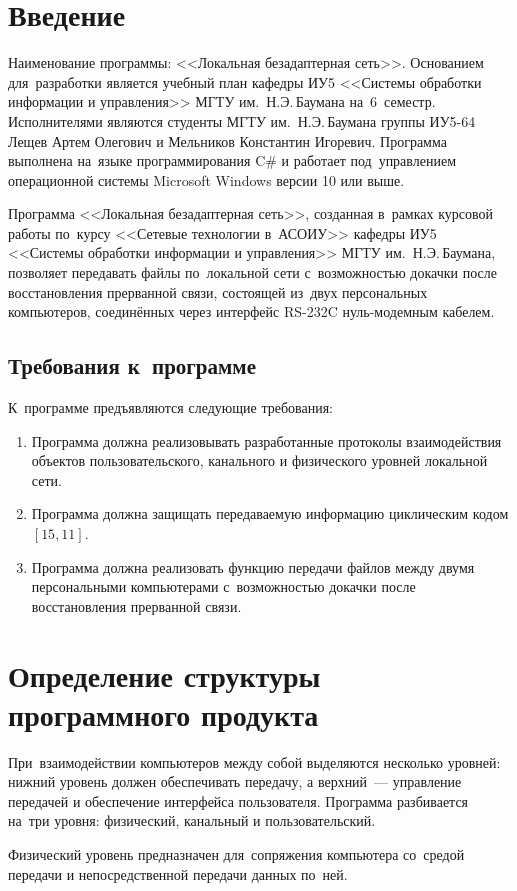 \documentclass[a4paper,12pt]{article}
\begin{document}
\section{Введение}
Наименование программы: <<Локальная безадаптерная сеть>>. Основанием для~разработки является учебный план кафедры ИУ5 <<Системы обработки информации и управления>> МГТУ им.~Н.Э.\,Баумана на~6~семестр. Исполнителями являются студенты МГТУ им.~Н.Э.\,Баумана группы ИУ5-64 Лещев Артем Олегович и Мельников Константин Игоревич. Программа выполнена на~языке программирования C\# и работает под~управлением операционной системы Microsoft Windows версии 10 или выше.

Программа <<Локальная безадаптерная сеть>>, созданная в~рамках курсовой работы по~курсу <<Сетевые технологии в~АСОИУ>> кафедры ИУ5 <<Системы обработки информации и управления>> МГТУ им.~Н.Э.\,Баумана, позволяет передавать файлы по~локальной сети с~возможностью докачки после восстановления прерванной связи, состоящей из~двух персональных компьютеров, соединённых через интерфейс RS-232C нуль-модемным кабелем.

\subsection{Требования к~программе}
К~программе предъявляются следующие требования:
\begin{enumerate}
\item Программа должна реализовывать разработанные протоколы взаимодействия объектов пользовательского, канального и физического уровней локальной сети.
\item Программа должна защищать передаваемую информацию циклическим кодом $[15,11]$.
\item Программа должна реализовать функцию передачи файлов между двумя персональными компьютерами с~возможностью докачки после восстановления прерванной связи.
\end{enumerate}

\section{Определение структуры программного продукта}
При~взаимодействии компьютеров между собой выделяются несколько уровней: нижний уровень должен обеспечивать передачу, а верхний~--- управление передачей и обеспечение интерфейса пользователя. Программа разбивается на~три уровня: физический, канальный и пользовательский.

Физический уровень предназначен для~сопряжения компьютера со~средой передачи и непосредственной передачи данных по~ней.
\end{document}

